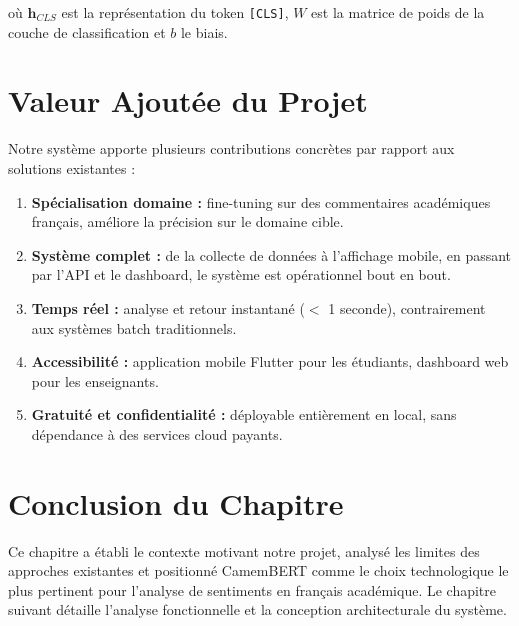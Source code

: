 où $\mathbf{h}_{CLS}$ est la représentation du token \texttt{[CLS]},
$W$ est la matrice de poids de la couche de classification et $b$ le
biais.

\section{Valeur Ajoutée du Projet}

Notre système apporte plusieurs contributions concrètes par rapport aux
solutions existantes :

\begin{definitionbox}
\begin{enumerate}
  \item \textbf{Spécialisation domaine :} fine-tuning sur des commentaires
        académiques français, améliore la précision sur le domaine cible.
  \item \textbf{Système complet :} de la collecte de données à l'affichage
        mobile, en passant par l'API et le dashboard, le système est
        opérationnel bout en bout.
  \item \textbf{Temps réel :} analyse et retour instantané ($<$ 1 seconde),
        contrairement aux systèmes batch traditionnels.
  \item \textbf{Accessibilité :} application mobile Flutter pour les
        étudiants, dashboard web pour les enseignants.
  \item \textbf{Gratuité et confidentialité :} déployable entièrement
        en local, sans dépendance à des services cloud payants.
\end{enumerate}
\end{definitionbox}

\section*{Conclusion du Chapitre}

Ce chapitre a établi le contexte motivant notre projet, analysé les
limites des approches existantes et positionné CamemBERT comme le choix
technologique le plus pertinent pour l'analyse de sentiments en français
académique. Le chapitre suivant détaille l'analyse fonctionnelle et la
conception architecturale du système.

\cleardoublepage
